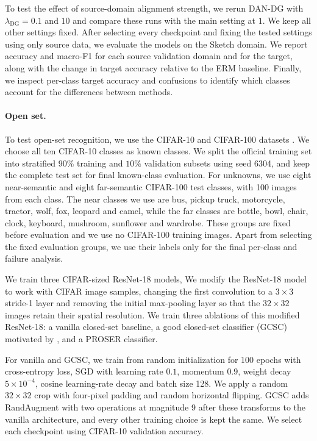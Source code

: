 \documentclass{article}
\begin{document}
To test the effect of source-domain alignment strength, we rerun DAN-DG with $\lambda_{\text{DG}}=0.1$ and $10$ and compare these runs with the main setting at $1$. We keep all other settings fixed. After selecting every checkpoint and fixing the tested settings using only source data, we evaluate the models on the Sketch domain. We report accuracy and macro-F1 for each source validation domain and for the target, along with the change in target accuracy relative to the ERM baseline. Finally, we inspect per-class target accuracy and confusions to identify which classes account for the differences between methods.

\paragraph{Open set.}\mbox{}\par
To test open-set recognition, we use the CIFAR-10 and CIFAR-100 datasets \citep{krizhevsky2009cifar}. We choose all ten CIFAR-10 classes as known classes. We split the official training set into stratified $90\%$ training and $10\%$ validation subsets using seed 6304, and keep the complete test set for final known-class evaluation. For unknowns, we use eight near-semantic and eight far-semantic CIFAR-100 test classes, with 100 images from each class. The near classes we use are bus, pickup truck, motorcycle, tractor, wolf, fox, leopard and camel, while the far classes are bottle, bowl, chair, clock, keyboard, mushroom, sunflower and wardrobe. These groups are fixed before evaluation and we use no CIFAR-100 training images. Apart from selecting the fixed evaluation groups, we use their labels only for the final per-class and failure analysis.

We train three CIFAR-sized ResNet-18 models,
We modify the ResNet-18 model to work with CIFAR image samples, changing the first convolution to a $3\times3$ stride-1 layer and removing the initial max-pooling layer so that the $32\times32$ images retain their spatial resolution.
We train three ablations of this modified ResNet-18: a vanilla closed-set baseline, a good closed-set classifier (GCSC) motivated by \citet{vaze2022osr}, and a PROSER classifier.

For vanilla and GCSC, we train from random initialization for 100 epochs with cross-entropy loss, SGD with learning rate $0.1$, momentum $0.9$, weight decay $5\times10^{-4}$, cosine learning-rate decay and batch size 128. We apply a random $32\times32$ crop with four-pixel padding and random horizontal flipping. GCSC adds RandAugment \citep{cubuk2020randaugment} with two operations at magnitude 9 after these transforms to the vanilla architecture, and every other training choice is kept the same. We select each checkpoint using CIFAR-10 validation accuracy. 
\end{document}
